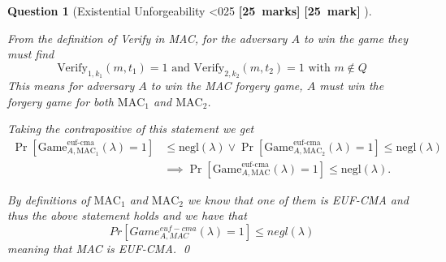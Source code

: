 \documentclass[a4paper]{article}
\theoremstyle{que}
\newtheorem{question}{Question}
\newcommand\points[1]{%
\ifnum1<0#1\relax%
    {\bf \small [#1~marks]}%
  \else%
    {\bf \small [#1~mark]}%
  \fi%
}%
\begin{document}
\begin{question}[Existential Unforgeability \points{25}]
\begin{enumerate}[label=(\alph*)]
    From the definition of Verify in MAC, for the adversary \(A\) to win the game they must find
    \[\text{Verify}_{1,k_1}(m,t_1) = 1 \text{ and } \text{Verify}_{2,k_2}(m,t_2) = 1 \text{ with } m \notin Q\]
    This means for adversary \(A\) to win the MAC forgery game, \(A\) must win the forgery game for both \(\text{MAC}_1\) and \(\text{MAC}_2\).
    
    Taking the contrapositive of this statement we get 
    \[
    \begin{aligned}
    \Pr[\text{Game}_{A,\text{MAC}_1}^{\text{euf-cma}}(\lambda) = 1] &\leq \text{negl}(\lambda) \lor \Pr[\text{Game}_{A,\text{MAC}_2}^{\text{euf-cma}}(\lambda) = 1] \leq \text{negl}(\lambda) \\
    &\implies \Pr[\text{Game}_{A,\text{MAC}}^{\text{euf-cma}}(\lambda) = 1] \leq \text{negl}(\lambda).
    \end{aligned}
    \]

    By definitions of \(\text{MAC}_1\) and \(\text{MAC}_2\) we know that one of them is EUF-CMA and thus the above statement holds and we have that
    \[Pr[Game_{A,MAC}^{euf-cma}(\lambda) = 1] \leq negl(\lambda)\]
    meaning that MAC is EUF-CMA. \qed

    
  \end{enumerate}
\end{question}

\newpage
\printbibliography
\end{document}
